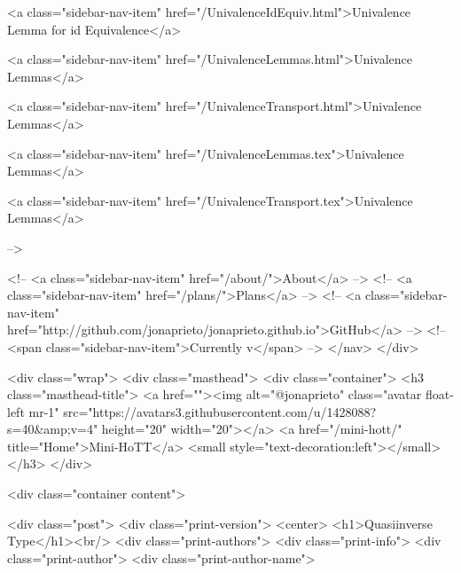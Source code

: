       
    
      
        
          <a class="sidebar-nav-item" href="/UnivalenceIdEquiv.html">Univalence Lemma for id Equivalence</a>
        
      
    
      
        
          <a class="sidebar-nav-item" href="/UnivalenceLemmas.html">Univalence Lemmas</a>
        
      
    
      
        
          <a class="sidebar-nav-item" href="/UnivalenceTransport.html">Univalence Lemmas</a>
        
      
    
      
        
          <a class="sidebar-nav-item" href="/UnivalenceLemmas.tex">Univalence Lemmas</a>
        
      
    
      
        
          <a class="sidebar-nav-item" href="/UnivalenceTransport.tex">Univalence Lemmas</a>
        
      
     -->

    <!-- <a class="sidebar-nav-item" href="/about/">About</a> -->
    <!-- <a class="sidebar-nav-item" href="/plans/">Plans</a> -->
    <!-- <a class="sidebar-nav-item" href="http://github.com/jonaprieto/jonaprieto.github.io">GitHub</a> -->
    <!-- <span class="sidebar-nav-item">Currently v</span> -->
  </nav>
</div>

    <div class="wrap">
      <div class="masthead">
        <div class="container">
          <h3 class="masthead-title">
            <a href=""><img alt="@jonaprieto" class="avatar float-left mr-1" src="https://avatars3.githubusercontent.com/u/1428088?s=40&amp;v=4" height="20" width="20"></a>
            <a href="/mini-hott/" title="Home">Mini-HoTT</a>
            <small style="text-decoration:left"></small>
          </h3>
        </div>
      
      <div class="container content">
        







<div class="post">
  <div class="print-version">
    <center>
      <h1>Quasiinverse Type</h1><br/>
        <div class="print-authors">
          <div class="print-info">
            <div class="print-author">
              <div class="print-author-name">
                
